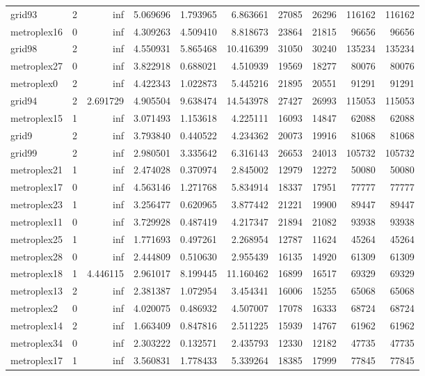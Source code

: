 \begin{longtable}{|l|r|r|r|r|r|r|r|r|r|}
grid93 & 2 & inf & 5.069696 & 1.793965 & 6.863661 & 27085 & 26296 & 116162 & 116162 \\
metroplex16 & 0 & inf & 4.309263 & 4.509410 & 8.818673 & 23864 & 21815 & 96656 & 96656 \\
grid98 & 2 & inf & 4.550931 & 5.865468 & 10.416399 & 31050 & 30240 & 135234 & 135234 \\
metroplex27 & 0 & inf & 3.822918 & 0.688021 & 4.510939 & 19569 & 18277 & 80076 & 80076 \\
metroplex0 & 2 & inf & 4.422343 & 1.022873 & 5.445216 & 21895 & 20551 & 91291 & 91291 \\
grid94 & 2 & 2.691729 & 4.905504 & 9.638474 & 14.543978 & 27427 & 26993 & 115053 & 115053 \\
metroplex15 & 1 & inf & 3.071493 & 1.153618 & 4.225111 & 16093 & 14847 & 62088 & 62088 \\
grid9 & 2 & inf & 3.793840 & 0.440522 & 4.234362 & 20073 & 19916 & 81068 & 81068 \\
grid99 & 2 & inf & 2.980501 & 3.335642 & 6.316143 & 26653 & 24013 & 105732 & 105732 \\
metroplex21 & 1 & inf & 2.474028 & 0.370974 & 2.845002 & 12979 & 12272 & 50080 & 50080 \\
metroplex17 & 0 & inf & 4.563146 & 1.271768 & 5.834914 & 18337 & 17951 & 77777 & 77777 \\
metroplex23 & 1 & inf & 3.256477 & 0.620965 & 3.877442 & 21221 & 19900 & 89447 & 89447 \\
metroplex11 & 0 & inf & 3.729928 & 0.487419 & 4.217347 & 21894 & 21082 & 93938 & 93938 \\
metroplex25 & 1 & inf & 1.771693 & 0.497261 & 2.268954 & 12787 & 11624 & 45264 & 45264 \\
metroplex28 & 0 & inf & 2.444809 & 0.510630 & 2.955439 & 16135 & 14920 & 61309 & 61309 \\
metroplex18 & 1 & 4.446115 & 2.961017 & 8.199445 & 11.160462 & 16899 & 16517 & 69329 & 69329 \\
metroplex13 & 2 & inf & 2.381387 & 1.072954 & 3.454341 & 16006 & 15255 & 65068 & 65068 \\
metroplex2 & 0 & inf & 4.020075 & 0.486932 & 4.507007 & 17078 & 16333 & 68724 & 68724 \\
metroplex14 & 2 & inf & 1.663409 & 0.847816 & 2.511225 & 15939 & 14767 & 61962 & 61962 \\
metroplex34 & 0 & inf & 2.303222 & 0.132571 & 2.435793 & 12330 & 12182 & 47735 & 47735 \\
metroplex17 & 1 & inf & 3.560831 & 1.778433 & 5.339264 & 18385 & 17999 & 77845 & 77845 \\

\end{longtable}
